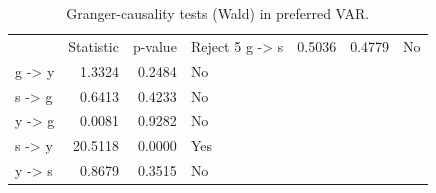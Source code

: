 \begin{table}[H]
\centering
\caption{Granger-causality tests (Wald) in preferred VAR.}
\label{tab:granger}
\begin{tabular}{lrrl}
\toprule
 & Statistic & p-value & Reject 5%
\midrule
g -> s & 0.5036 & 0.4779 & No \\
g -> y & 1.3324 & 0.2484 & No \\
s -> g & 0.6413 & 0.4233 & No \\
y -> g & 0.0081 & 0.9282 & No \\
s -> y & 20.5118 & 0.0000 & Yes \\
y -> s & 0.8679 & 0.3515 & No \\
\bottomrule
\end{tabular}
\end{table}